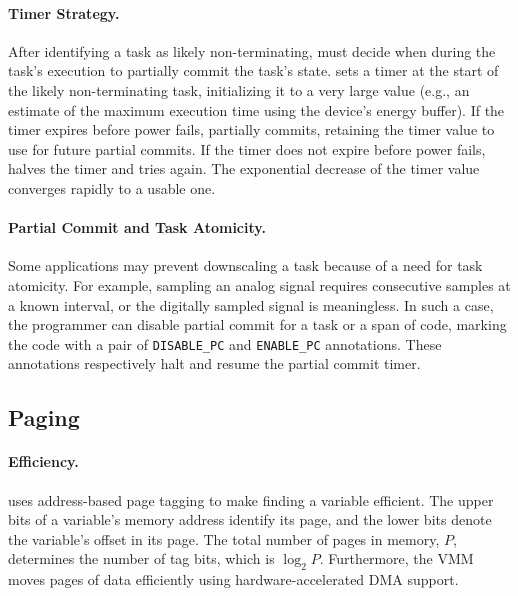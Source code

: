 \paragraph{Timer Strategy.}
After identifying a task as likely non-terminating, \sys must decide when during the task's execution to partially commit the task's state. \sys sets a timer at the start of the likely non-terminating task, initializing it to a very large value (e.g., an estimate of the maximum execution time using the device's energy buffer). If the timer expires before power fails, \sys partially commits, retaining  the timer value to use for future partial commits. If the timer does not expire before power fails, \sys halves the timer and tries again. The exponential decrease of the timer value converges rapidly to a usable one.
%

 \paragraph{Partial Commit and Task Atomicity.}
 Some applications may prevent
downscaling a task because of a need for task atomicity.  For example, sampling
an analog signal requires consecutive samples at a known interval, or the
digitally sampled signal is meaningless.  In such a case, the programmer can
disable partial commit for a task or a span of code, marking  the code with a
pair of \texttt{DISABLE\_PC} and \texttt{ENABLE\_PC} annotations.
These annotations respectively halt and resume the partial commit timer.

\subsection{Paging}
\label{sec:impl:paging}


\paragraph{Efficiency.}
\sys uses address-based page tagging to make finding a variable efficient.  The
upper bits of a variable's memory address identify its page, and the lower bits
denote the variable's offset in its page. The total number of pages in memory,
$P$, determines the number of tag bits, which is $\log_2 P$.
%
Furthermore, the VMM moves pages of data efficiently using hardware-accelerated DMA support.

